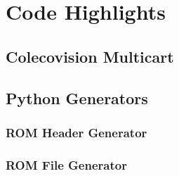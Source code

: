\documentclass{article}
\begin{document}
  \newpage

  \section{Code Highlights}

%   
%   
%   
%   
%   
%   
%   
%   

  \subsection{Colecovision Multicart}

  \subsection{Python Generators}

  \subsubsection{ROM Header Generator}

  \subsubsection{ROM File Generator}
\end{document}
